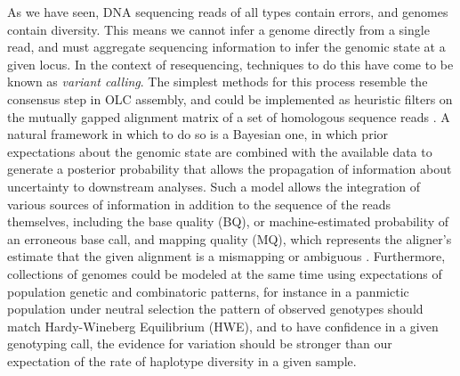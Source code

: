 As we have seen, DNA sequencing reads of all types contain errors, and genomes contain diversity.
This means we cannot infer a genome directly from a single read, and must aggregate sequencing information to infer the genomic state at a given locus.
In the context of resequencing, techniques to do this have come to be known as \emph{variant calling}.
The simplest methods for this process resemble the consensus step in OLC assembly, and could be implemented as heuristic filters on the mutually gapped alignment matrix of a set of homologous sequence reads \cite{koboldt2009varscan}.
A natural framework in which to do so is a Bayesian one, in which prior expectations about the genomic state are combined with the available data to generate a posterior probability that allows the propagation of information about uncertainty to downstream analyses.
Such a model allows the integration of various sources of information in addition to the sequence of the reads themselves, including the base quality (BQ), or machine-estimated probability of an erroneous base call, and mapping quality (MQ), which represents the aligner's estimate that the given alignment is a mismapping or ambiguous \cite{li2011stats}.
Furthermore, collections of genomes could be modeled at the same time using expectations of population genetic and combinatoric patterns, for instance in a panmictic population under neutral selection the pattern of observed genotypes should match Hardy-Wineberg Equilibrium (HWE), and to have confidence in a given genotyping call, the evidence for variation should be stronger than our expectation of the rate of haplotype diversity in a given sample.

